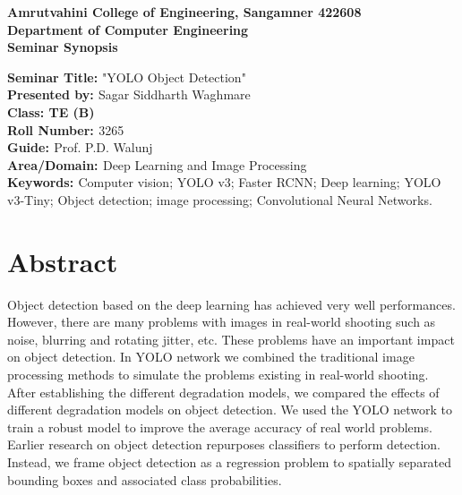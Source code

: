 \documentclass[11pt, oneside]{Thesis} %
\begin{document}
	\begin{titlepage}   
	\renewcommand{\baselinestretch}{1}
		\begin{center}
			{\Large \bf {Amrutvahini College of Engineering, Sangamner 422608}}\\
			{\bf {Department of Computer Engineering}}\\
			{\bf {Seminar Synopsis}}
			
			
			\noindent\makebox[\linewidth]{\rule{\paperwidth}{0.4pt}}
		\end{center}
		{\bf {Seminar Title:}} {"YOLO Object Detection"}\\
			{\bf {Presented by: }} {Sagar Siddharth Waghmare}\\
			{\bf {Class: TE (B) }}\\
			{\bf{Roll Number: }} {3265}\\
			{\bf {Guide: }} { Prof. P.D. Walunj}\\			
			{\bf {Area/Domain: }}{Deep Learning and Image Processing}\\
			{\bf {Keywords: }}{Computer vision; YOLO v3; Faster RCNN; Deep 
learning; YOLO v3-Tiny; Object detection; image processing; 
Convolutional Neural Networks. }
			 \section*{Abstract}
			Object detection based on the deep learning has achieved very well performances. However, there are many problems with images in real-world shooting such as noise, blurring
and rotating jitter, etc. These problems have an important impact on object detection.
In YOLO network we combined the traditional image processing methods to simulate the
problems existing in real-world shooting. After establishing the different degradation
models, we compared the effects of different degradation models on object detection.
We used the YOLO network to train a robust model to improve the average accuracy of real world problems. Earlier research on object detection repurposes classifiers to perform detection. Instead, we frame object detection as a regression problem to spatially separated bounding boxes and associated class probabilities.

\end{titlepage}
\end{document}
